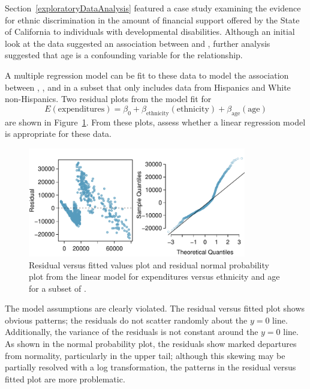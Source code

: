 \begin{example}{Section~\ref{exploratoryDataAnalysis} featured a case study examining the evidence for ethnic discrimination in the amount of financial support offered by the State of California to individuals with developmental disabilities. Although an initial look at the data suggested an association between  and , further analysis suggested that age is a confounding variable for the relationship.

A multiple regression model can be fit to these data to model the association between , , and  in a subset that only includes data from Hispanics and White non-Hispanics. Two residual plots from the model fit for 
\[E(\text{expenditures}) = \beta_0 +  \beta_{\text{ethnicity}}(\text{ethnicity}) + \beta_{\text{age}}(\text{age}) \]
are shown in Figure~\ref{ddsAgeEthnicityResidNormPlot}. From these plots, assess whether a linear regression model is appropriate for these data. 

\begin{figure}[h!]
	\centering
	\includegraphics[width=0.85\textwidth]
	{ch_multiple_linear_regression_oi_biostat/figures/ddsAgeEthnicityResidNormPlot/ddsAgeEthnicityResidNormPlot.pdf}
	\caption{Residual versus fitted values plot and residual normal probability plot from the linear model for expenditures versus ethnicity and age for a subset of .}
	\label{ddsAgeEthnicityResidNormPlot}
\end{figure}		
		
	
}

The model assumptions are clearly violated. The residual versus fitted plot	shows obvious patterns; the residuals do not scatter randomly about the $y = 0$ line. Additionally, the variance of the residuals is not constant around the $y = 0$ line. As shown in the normal probability plot, the residuals show marked departures from normality, particularly in the upper tail; although this skewing may be partially resolved with a log transformation, the patterns in the residual versus fitted plot are more problematic.


\end{example}
